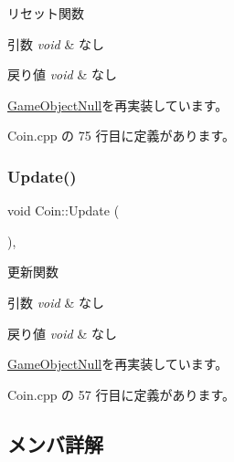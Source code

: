 リセット関数 


\begin{DoxyParams}{引数}
{\em void} & なし \\
\hline
\end{DoxyParams}

\begin{DoxyRetVals}{戻り値}
{\em void} & なし \\
\hline
\end{DoxyRetVals}


\mbox{\hyperlink{class_game_object_null_a26a748e17ea31b987249022562f5198c}{Game\+Object\+Null}}を再実装しています。



 Coin.\+cpp の 75 行目に定義があります。

\mbox{\label{class_coin_a6969409d8c97fc0f51dfe10d5b5072c6}} 
\subsubsection{\texorpdfstring{Update()}{Update()}}
{\footnotesize\ttfamily void Coin\+::\+Update (\begin{DoxyParamCaption}{ }\end{DoxyParamCaption})\hspace{0.3cm}{\ttfamily [override]}, {\ttfamily [virtual]}}



更新関数 


\begin{DoxyParams}{引数}
{\em void} & なし \\
\hline
\end{DoxyParams}

\begin{DoxyRetVals}{戻り値}
{\em void} & なし \\
\hline
\end{DoxyRetVals}


\mbox{\hyperlink{class_game_object_null_aeeb51b7e7aa41fd0b16f8f7c016bdb55}{Game\+Object\+Null}}を再実装しています。



 Coin.\+cpp の 57 行目に定義があります。



\subsection{メンバ詳解}
\mbox{\label{class_coin_ad7ac386426c33a4f74018ebea69bb479}} 
